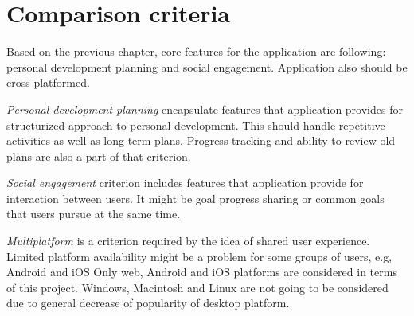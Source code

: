
\section{Comparison criteria}\label{sec:comparison-criteria}



Based on the previous chapter, core features for the application are following: personal development planning and social engagement.
Application also should be cross-platformed.

\textit{Personal development planning} encapsulate features that application provides for structurized approach to personal development.
This should handle repetitive activities as well as long-term plans.
Progress tracking and ability to review old plans are also a part of that criterion.

\textit{Social engagement} criterion includes features that application provide for interaction between users.
It might be goal progress sharing or common goals that users pursue at the same time.

\textit{Multiplatform} is a criterion required by the idea of shared user experience.
Limited platform availability might be a problem for some groups of users, e.g, Android and iOS\@
Only web, Android and iOS platforms are considered in terms of this project.
Windows, Macintosh and Linux are not going to be considered due to general decrease of popularity of desktop platform.\cite{mobile-vs-desktop}

